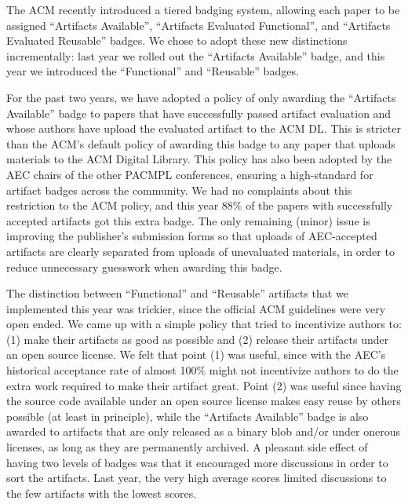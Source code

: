 The ACM recently introduced a tiered badging system, allowing each
paper to be assigned “Artifacts Available”, “Artifacts Evaluated
Functional”, and “Artifacts Evaluated Reusable” badges. We chose to
adopt these new distinctions incrementally: last year we rolled out
the “Artifacts Available” badge, and this year we introduced the
“Functional” and “Reusable” badges.

For the past two years, we have adopted a policy of only awarding the
“Artifacts Available” badge to papers that have successfully passed
artifact evaluation and whose authors have upload the evaluated
artifact to the ACM DL. This is stricter than the ACM's default policy
of awarding this badge to any paper that uploads materials to the ACM
Digital Library. This policy has also been adopted by the AEC chairs
of the other PACMPL conferences, ensuring a high-standard for artifact
badges across the community. We had no complaints about this
restriction to the ACM policy, and this year 88\% of the papers with
successfully accepted artifacts got this extra badge. The only
remaining (minor) issue is improving the publisher's submission forms
so that uploads of AEC-accepted artifacts are clearly separated from
uploads of unevaluated materials, in order to reduce unnecessary
guesswork when awarding this badge.

The distinction between “Functional” and “Reusable” artifacts that we
implemented this year was trickier, since the official ACM guidelines
were very open ended. We came up with a simple policy that tried to
incentivize authors to: (1) make their artifacts as good as possible
and (2) release their artifacts under an open source license. We felt
that point (1) was useful, since with the AEC's historical acceptance
rate of almost 100\% might not incentivize authors to do the extra
work required to make their artifact great. Point (2) was useful since
having the source code available under an open source license makes
easy reuse by others possible (at least in principle), while the
“Artifacts Available” badge is also awarded to artifacts that are only
released as a binary blob and/or under onerous licenses, as long as
they are permanently archived. A pleasant side effect of having two
levels of badges was that it encouraged more discussions in order to
sort the artifacts. Last year, the very high average scores limited
discussions to the few artifacts with the lowest scores.

